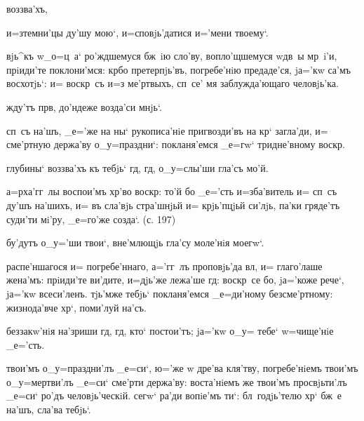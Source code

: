 
  воззва'хъ, 


  и=з\ъ темни'цы ду'шу мою`, 
и=сповjь'датися и='мени твоему`.

 вjь^къ w\т _о=ц~а` ро'ждшемуся бж~iю 
сло'ву, вопло'щшемуся w\т дв~ы мр~i'и, прiиди'те 
поклони'мся: кр бо претерпjь'въ, погребе'нiю 
предаде'ся, jа='кw са'мъ восхотjь`: и= воскр~съ и=з\ъ 
ме'ртвыхъ, сп~се' мя заблужда'ющаго человjь'ка.

  жду'тъ прв, до'ндеже возда'си 
мнjь`.

 сп~съ на'шъ, _е='же на ны` рукописа'нiе 
пригвозди'въ на кр` загла'ди, и= сме'ртную держа'ву 
о_у=праздни`: покланя'емся _е=гw` тридне'вному 
воскр.

  глубины` воззва'хъ къ тебjь` гд, 
гд, о_у=слы'ши гла'съ мо'й.

 а=рха'гг~лы воспои'мъ хр'во воскр: 
то'й бо _е='сть и=зба'витель и= сп~съ ду'шъ на'шихъ, и= 
въ сла'вjь стра'шнjьй и= крjь'пцjьй си'лjь, па'ки 
гряде'тъ суди'ти мi'ру, _е=го'же созда`. (с. 197)


  бу'дутъ о_у='ши твои`, вне'млющjь 
гла'су моле'нiя моегw`.

 распе'ншагося и= погребе'ннаго, а='гг~лъ 
проповjь'да вл, и= глаго'лаше жена'мъ: прiиди'те 
ви'дите, и=дjь'же лежа'ше гд: воскр~се бо, jа='коже 
рече`, jа='кw всеси'ленъ. тjь'мже тебjь` покланя'емся 
_е=ди'ному безсме'ртному: жизнода'вче хр`, поми'луй 
на'съ.

  беззакw'нiя на'зриши гд, гд, 
кто` постои'тъ; jа='кw о_у= тебе` w=чище'нiе _е='сть.

 твои'мъ о_у=праздни'лъ _е=си`, ю='же w\т 
дре'ва кля'тву, погребе'нiемъ твои'мъ о_у=мертви'лъ 
_е=си` сме'рти держа'ву: воста'нiемъ же твои'мъ 
просвjьти'лъ _е=си` ро'дъ человjь'ческiй. сегw` ра'ди 
вопiе'мъ ти`: бл~годjь'телю хр` бж~е на'шъ, сла'ва 
тебjь`.

